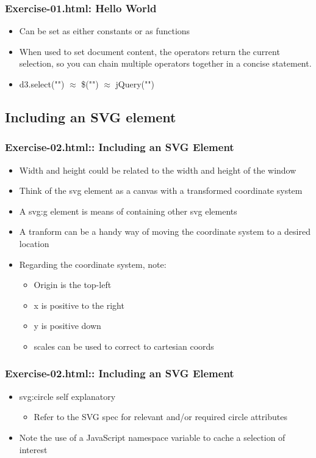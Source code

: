 \documentclass{beamer}
\begin{document}
\begin{frame}
    \frametitle{Exercise-01.html: Hello World}
    \begin{itemize}
    \item Can be set as either constants or as functions
    \item When used to set document content, the operators return the current selection, so you can chain multiple operators together in a concise statement.
    \item d3.select("") $\approx$ \$("") $\approx$ jQuery("")
    \end{itemize}
\end{frame}




\subsection{Including an SVG element}

\begin{frame}
    \frametitle{Exercise-02.html:: Including an SVG Element}
    \begin{itemize}
    \item Width and height could be related to the width and height of the window
    \item Think of the svg element as a canvas with a transformed coordinate system
    \item A svg:g element is means of containing other svg elements
    \item A tranform can be a handy way of moving the coordinate system to a desired location
    \item Regarding the coordinate system, note:
        \begin{itemize}
        \item Origin is the top-left
        \item x is positive to the right
        \item y is positive down
        \item scales can be used to correct to cartesian coords
        \end{itemize}
    \end{itemize}
\end{frame}


\begin{frame}
    \frametitle{Exercise-02.html:: Including an SVG Element}
    \begin{itemize}
    \item svg:circle self explanatory
        \begin{itemize}
        \item Refer to the SVG spec for relevant and/or required circle attributes
        \end{itemize}
    \item Note the use of a JavaScript namespace variable to cache a selection of interest
    \end{itemize}
\end{frame}
\end{document}
